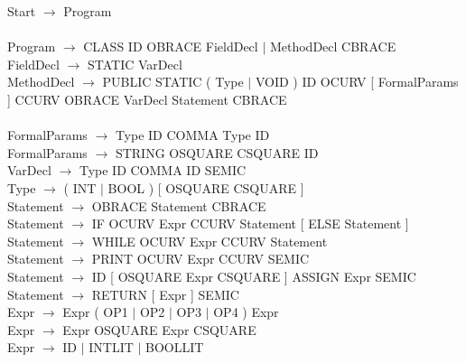 \documentclass[11pt,a4paper]{article}
\begin{document}
\hspace{-1cm}\vspace{.1cm}Start $\rightarrow$ Program \\ \\
\vspace{.5cm}Program $\rightarrow$ CLASS ID OBRACE { FieldDecl $\mid$ MethodDecl } CBRACE\\
\vspace{.5cm}FieldDecl $\rightarrow$ STATIC VarDecl\\
MethodDecl $\rightarrow$ PUBLIC STATIC ( Type $\mid$ VOID ) ID OCURV [ FormalParams ] CCURV OBRACE { VarDecl } { Statement } CBRACE\\ \\
\vspace{.5cm}FormalParams $\rightarrow$ Type ID { COMMA Type ID }\\
\vspace{.5cm}FormalParams $\rightarrow$ STRING OSQUARE CSQUARE ID\\
\vspace{.5cm}VarDecl $\rightarrow$ Type ID { COMMA ID } SEMIC\\
\vspace{.5cm}Type $\rightarrow$ ( INT $\mid$ BOOL ) [ OSQUARE CSQUARE ]\\
\vspace{.5cm}Statement $\rightarrow$ OBRACE { Statement } CBRACE\\
\vspace{.5cm}Statement $\rightarrow$ IF OCURV Expr CCURV Statement [ ELSE Statement ]\\
\vspace{.5cm}Statement $\rightarrow$ WHILE OCURV Expr CCURV Statement\\
\vspace{.5cm}Statement $\rightarrow$ PRINT OCURV Expr CCURV SEMIC\\
\vspace{.5cm}Statement $\rightarrow$ ID [ OSQUARE Expr CSQUARE ] ASSIGN Expr SEMIC\\
\vspace{.5cm}Statement $\rightarrow$ RETURN [ Expr ] SEMIC\\
\vspace{.5cm}Expr $\rightarrow$ Expr ( OP1 $\mid$ OP2 $\mid$ OP3 $\mid$ OP4 ) Expr\\
\vspace{.5cm}Expr $\rightarrow$ Expr OSQUARE Expr CSQUARE\\
\vspace{.5cm}Expr $\rightarrow$ ID $\mid$ INTLIT $\mid$ BOOLLIT\\
\end{document}
